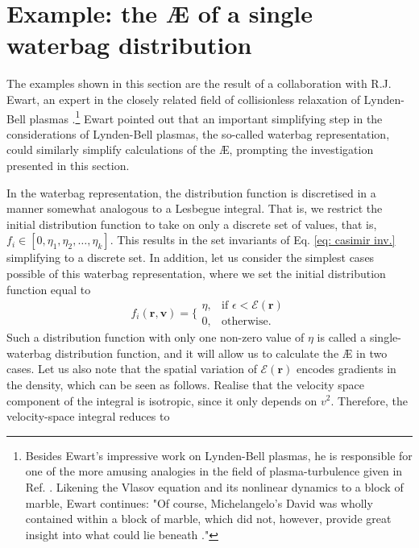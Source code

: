 \section{Example: the \AE{} of a single waterbag distribution}
The examples shown in this section are the result of a collaboration with R.J. Ewart, an expert in the closely related field of collisionless relaxation of Lynden-Bell plasmas \cite{ewart2022collisionless,ewart2023non}.\footnote{Besides Ewart's impressive work on Lynden-Bell plasmas, he is responsible for one of the more amusing analogies in the field of plasma-turbulence given in Ref. \cite{ewart2022collisionless}. Likening the Vlasov equation and its nonlinear dynamics to a block of marble, Ewart continues: "Of course, Michelangelo's David was wholly contained within a block of marble, which did not, however, provide great insight into what could lie beneath \cite{coonin2014marble}."} Ewart pointed out that an important simplifying step in the considerations of Lynden-Bell plasmas, the so-called waterbag representation, could similarly simplify calculations of the \AE{}, prompting the investigation presented in this section. \par 
In the waterbag representation, the distribution function is discretised in a manner somewhat analogous to a Lesbegue integral. That is, we restrict the initial distribution function to take on only a discrete set of values, that is, $f_i \in [0,\eta_1,\eta_2,\dots,\eta_k]$. This results in the set invariants of Eq. \eqref{eq: casimir inv.} simplifying to a discrete set. In addition, let us consider the simplest cases possible of this waterbag representation, where we set the initial distribution function equal to
\begin{equation}
f_i(\boldsymbol{r},\boldsymbol{v}) = 
\Bigg\{
    \begin{array}{lr}
        \eta, & \text{if } \epsilon < \mathcal{E}(\boldsymbol{r})\\
        0, & \text{otherwise}.
    \end{array}
\end{equation}
Such a distribution function with only one non-zero value of $\eta$ is called a single-waterbag distribution function, and it will allow us to calculate the \AE{} in two cases. Let us also note that the spatial variation of $\mathcal{E}(\boldsymbol{r})$ encodes gradients in the density, which can be seen as follows. Realise that the velocity space component of the integral is isotropic, since it only depends on $v^2$. Therefore, the velocity-space integral reduces to
